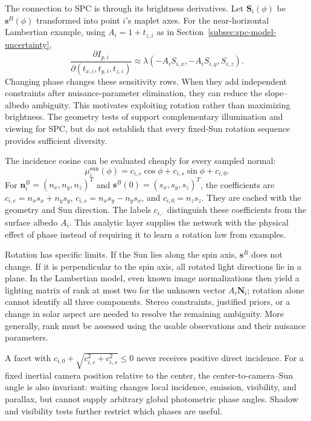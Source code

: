The connection to SPC is through its brightness derivatives. Let $\mathbf S_i(\phi)$ be $\mathbf s^B(\phi)$ transformed into point $i$'s maplet axes. For the near-horizontal Lambertian example, using $A_i=1+t_{z,i}$ as in Section~\ref{subsec:spc-model-uncertainty},
\begin{equation}
    \frac{\partial I_{p,i}}{\partial(t_{x,i},t_{y,i},t_{z,i})}
    \approx\lambda(-A_i S_{i,x},-A_i S_{i,y},S_{i,z}).
    \label{eq:planner-rotation-sensitivity}
\end{equation}
Changing phase changes these sensitivity rows. When they add independent constraints after nuisance-parameter elimination, they can reduce the slope--albedo ambiguity. This motivates exploiting rotation rather than maximizing brightness. The geometry tests of \citet{palmer2024geometry} support complementary illumination and viewing for SPC, but do not establish that every fixed-Sun rotation sequence provides sufficient diversity.

The incidence cosine can be evaluated cheaply for every sampled normal:
\begin{equation}
    \mu_i^{\mathrm{sun}}(\phi)
      =c_{i,c}\cos\phi+c_{i,s}\sin\phi+c_{i,0}.
    \label{eq:planner-incidence-harmonic}
\end{equation}
For $\mathbf n_i^B=(n_x,n_y,n_z)^T$ and $\mathbf s^B(0)=(s_x,s_y,s_z)^T$, the coefficients are $c_{i,c}=n_xs_x+n_ys_y$, $c_{i,s}=n_xs_y-n_ys_x$, and $c_{i,0}=n_zs_z$. They are cached with the geometry and Sun direction. The labels $c_{i,\cdot}$ distinguish these coefficients from the surface albedo $A_i$. This analytic layer supplies the network with the physical effect of phase instead of requiring it to learn a rotation law from examples.

Rotation has specific limits. If the Sun lies along the spin axis, $\mathbf s^B$ does not change. If it is perpendicular to the spin axis, all rotated light directions lie in a plane. In the Lambertian model, even known image normalizations then yield a lighting matrix of rank at most two for the unknown vector $A_i\mathbf N_i$; rotation alone cannot identify all three components. Stereo constraints, justified priors, or a change in solar aspect are needed to resolve the remaining ambiguity. More generally, rank must be assessed using the usable observations and their nuisance parameters.

A facet with $c_{i,0}+\sqrt{c_{i,c}^2+c_{i,s}^2}\leq0$ never receives positive direct incidence. For a fixed inertial camera position relative to the center, the center-to-camera--Sun angle is also invariant: waiting changes local incidence, emission, visibility, and parallax, but cannot supply arbitrary global photometric phase angles. Shadow and visibility tests further restrict which phases are useful.

